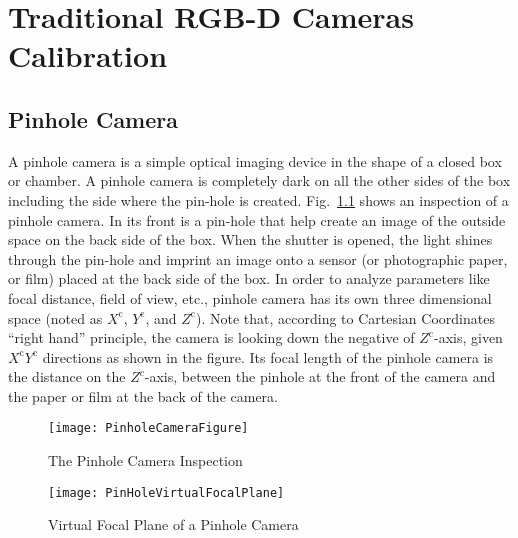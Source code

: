 \chapter{Traditional RGB-D Cameras Calibration} %
\label{chapterTraditionalCalibration} %

\section{Pinhole Camera}
\label{sectionPinholeCamera}
\indent
A pinhole camera is a simple optical imaging device in the shape of a closed box or chamber. A pinhole camera is completely dark on all the other sides of the box including the side where the pin-hole is created. Fig.~\ref{PinholeCameraFigure} shows an inspection of a pinhole camera. In its front is a pin-hole that help create an image of the outside space on the back side of the box. When the shutter is opened, the light shines through the pin-hole and imprint an image onto a sensor (or photographic paper, or film) placed at the back side of the box. In order to analyze parameters like focal distance, field of view, etc., pinhole camera has its own three dimensional space (noted as \(X^\text{c}\), \(Y^\text{c}\), and \(Z^\text{c}\)). Note that, according to Cartesian Coordinates \enquote{right hand} principle, the camera is looking down the negative of \(Z^\text{c}\)-axis, given \(X^\text{c}\)\(Y^\text{c}\) directions as shown in the figure. Its focal length of the pinhole camera is the distance on the \(Z^c\)-axis, between the pinhole at the front of the camera and the paper or film at the back of the camera.\par
%
\begin{figure}[!b]
\centering
\texttt{[image: PinholeCameraFigure]}
\caption{The Pinhole Camera Inspection}
\label{PinholeCameraFigure}
\end{figure}%
%
\begin{figure}[!h]
\centering
\texttt{[image: PinHoleVirtualFocalPlane]}
\caption{Virtual Focal Plane of a Pinhole Camera}
\label{PinHoleVirtualFocalPlane}
\end{figure}%

